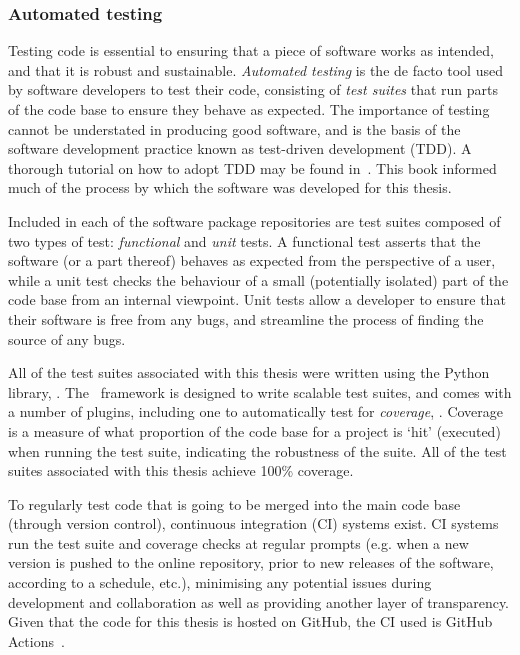 \subsubsection{Automated testing}

Testing code is essential to ensuring that a piece of software works as
intended, and that it is robust and sustainable. \emph{Automated testing} is the
de facto tool used by software developers to test their code, consisting of
\emph{test suites} that run parts of the code base to ensure they behave as
expected. The importance of testing cannot be understated in producing good
software, and is the basis of the software development practice known as
test-driven development (TDD). A thorough tutorial on how to adopt TDD may be
found in~\cite{Percival2017}. This book informed much of the process by which
the software was developed for this thesis. 

Included in each of the software package repositories are test suites composed
of two types of test: \emph{functional} and \emph{unit} tests. A functional test
asserts that the software (or a part thereof) behaves as expected from the
perspective of a user, while a unit test checks the behaviour of a small
(potentially isolated) part of the code base from an internal viewpoint. Unit
tests allow a developer to ensure that their software is free from any bugs, and
streamline the process of finding the source of any bugs.

All of the test suites associated with this thesis were written using the Python
library, \href{https://docs.pytest.org/en/stable/}{\pytest}. The \pytest\
framework is designed to write scalable test suites, and comes with a number of
plugins, including one to automatically test for \emph{coverage},
\href{https://pytest-cov.readthedocs.io/en/latest/}{\pytestcov}.
Coverage is a measure of what proportion of the code base for a project is `hit'
(executed) when running the test suite, indicating the robustness of the suite.
All of the test suites associated with this thesis achieve 100\% coverage.


To regularly test code that is going to be merged into the main code base
(through version control), continuous integration (CI) systems exist. CI systems
run the test suite and coverage checks at regular prompts (e.g. when a new
version is pushed to the online repository, prior to new releases of the
software, according to a schedule, etc.), minimising any potential issues during
development and collaboration as well as providing another layer of
transparency. Given that the code for this thesis is hosted on GitHub, the CI
used is GitHub Actions~\cite{github-actions}.


